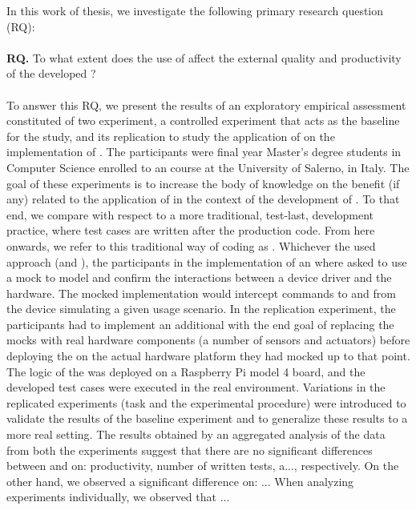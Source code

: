 In this work of thesis, we investigate the following primary research question (RQ):
\\ \ \\
\noindent \textbf{RQ.} To what extent does the use of \tdd affect the external quality and productivity of the developed \es?	
\\ \ \\
To answer this RQ, we present the results of an exploratory empirical assessment constituted of two experiment, a controlled experiment that acts as the baseline for the study, and its replication to study the application of \tdd on the implementation of \ess. The participants were final year Master's degree students in Computer Science enrolled to an \es course at the University of Salerno, in Italy. The goal of these experiments is to increase the body of knowledge on the benefit (if any) related to the application of \tdd in the context of the development of \ess. To that end, we compare \tdd with respect to a more traditional, test-last, development practice, where test cases are written after the production code. From here onwards, we refer to this traditional way of coding as \notdd. Whichever the used approach (\tdd and \notdd), the participants in the implementation of an \es where asked to use a mock to model and confirm the interactions between a device driver and the hardware. The mocked implementation would intercept commands to and from the device simulating a given usage scenario. In the replication experiment, the participants had to implement an additional \es with the end goal of replacing the mocks with real hardware components (a number of sensors and actuators) before deploying the \es on the actual hardware platform they had mocked up to that point. The logic of the \es was deployed on a Raspberry Pi model 4 board, and the developed test cases were executed in the real environment. Variations in the replicated experiments (task and the experimental procedure) were introduced to validate the results of the baseline experiment and to generalize these results to a more real setting. The results obtained by an aggregated analysis of the data from both the experiments suggest that there are no significant differences between \tdd and \notdd on: productivity, number of written tests, a..., respectively. On the other hand, we observed a significant difference on: ... When analyzing experiments individually, we observed that ...


